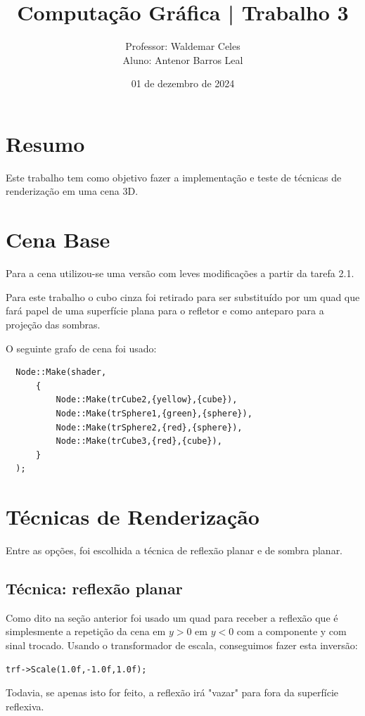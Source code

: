 \documentclass[11pt, a4paper]{article}
\title{Computação Gráfica | Trabalho 3}
\author{Professor: Waldemar Celes\\
Aluno: Antenor Barros Leal}
\date{01 de dezembro de 2024}
\begin{document}
\maketitle

\section {Resumo}
Este trabalho tem como objetivo fazer a implementação e teste de técnicas de renderização
em uma cena 3D.

\section {Cena Base}
Para a cena utilizou-se uma versão com leves modificações a partir da tarefa 2.1. 

Para este trabalho o cubo cinza foi retirado para ser substituído por um quad 
que fará papel de uma superfície plana para o refletor e como anteparo para a 
projeção das sombras.

O seguinte grafo de cena foi usado:

\begin{verbatim}
  Node::Make(shader,
      {
          Node::Make(trCube2,{yellow},{cube}),
          Node::Make(trSphere1,{green},{sphere}),
          Node::Make(trSphere2,{red},{sphere}),
          Node::Make(trCube3,{red},{cube}),
      }
  );
\end{verbatim}

\section {Técnicas de Renderização}

Entre as opções, foi escolhida a técnica de reflexão planar e de sombra planar.

\subsection {Técnica: reflexão planar}

Como dito na seção anterior foi usado um quad para receber a reflexão que é 
simplesmente a repetição da cena em $y > 0$ em $y < 0$ com a componente y
com sinal trocado. Usando o transformador de escala, conseguimos fazer esta 
inversão:

\begin{verbatim}
trf->Scale(1.0f,-1.0f,1.0f);
\end{verbatim}

Todavia, se apenas isto for feito, a reflexão irá "vazar" para fora da superfície
reflexiva.
\end{document}
